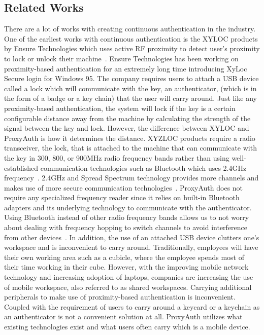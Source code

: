 \documentclass[letterpaper,twocolumn,10pt]{article}
\begin{document}
\subsection{Related Works} 
There are a lot of works with creating continuous authentication in the industry. One of the earliest works with continuous authentication is the XYLOC products by Ensure Technologies which uses active RF proximity to detect user's proximity to lock or unlock their machine~\cite{broch_ensure_tech}. Ensure Technologies has been working on proximity-based authentication for an extremely long time introducing XyLoc Secure login for Windows 95. The company requires users to attach a USB device called a lock which will communicate with the key, an authenticator, (which is in the form of a badge or a key chain) that the user will carry around. Just like any proximity-based authentication, the system will lock if the key is a certain configurable distance away from the machine by calculating the strength of the signal between the key and lock. However, the difference between XYLOC and ProxyAuth is how it determines the distance. XYZLOC products require a radio transceiver, the lock, that is attached to the machine that can communicate with the key in 300, 800, or 900MHz radio frequency bands rather than using well-established communication technologies such as Bluetooth which uses 2.4GHz frequency~\cite{broch_ensure_tech}. 2.4GHz and Spread Spectrum technology provides more channels and makes use of more secure communication technologies~\cite{paper_proximity_auth}. ProxyAuth does not require any specialized frequency reader since it relies on built-in Bluetooth adapters and its underlying technology to communicate with the authenticator. Using Bluetooth instead of other radio frequency bands allows us to not worry about dealing with frequency hopping to switch channels to avoid interference from other devices~\cite{paper_proximity_auth}. In addition, the use of an attached USB device clutters one's workspace and is inconvenient to carry around. Traditionally, employees will have their own working area such as a cubicle, where the employee spends most of their time working in their cube. However, with the improving mobile network technology and increasing adoption of laptops, companies are increasing the use of mobile workspace, also referred to as shared workspaces. Carrying additional peripherals to make use of proximity-based authentication is inconvenient. Coupled with the requirement of users to carry around a keycard or a keychain as an authenticator is not a convenient solution at all. ProxyAuth utilizes what existing technologies exist and what users often carry which is a mobile device.
\end{document}

